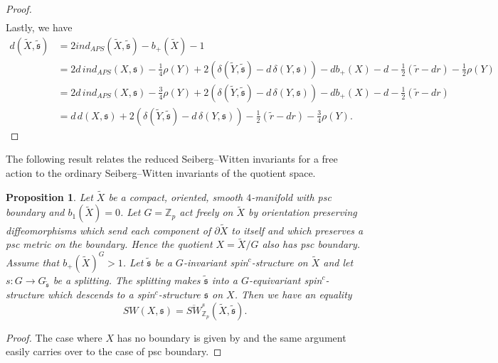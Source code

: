 \documentclass{amsart}
\newtheorem{proposition}[theorem]{Proposition}
\theoremstyle{definition}
\theoremstyle{remark}
\numberwithin{equation}{section}
\begin{document}
\begin{proof}
\begin{align*}
\end{align*}
Lastly, we have
\begin{align*}
d(\widetilde{X} , \widetilde{\mathfrak{s}}) &= 2 ind_{APS}(\widetilde{X} , \widetilde{\mathfrak{s}}) - b_+(\widetilde{X}) - 1 \\
&= 2d \, ind_{APS}(X , \mathfrak{s}) - \frac{1}{4}\rho(Y) + 2(\delta(\widetilde{Y} , \widetilde{\mathfrak{s}}) - d \, \delta(Y , \mathfrak{s})) - d b_+(X) - d -\frac{1}{2}( \widetilde{r} - dr) - \frac{1}{2}\rho(Y) \\
&= 2d \, ind_{APS}(X , \mathfrak{s}) - \frac{3}{4}\rho(Y) + 2(\delta(\widetilde{Y} , \widetilde{\mathfrak{s}}) - d \, \delta(Y , \mathfrak{s})) - d b_+(X) - d -\frac{1}{2}( \widetilde{r} - dr) \\
&= d \, d(X , \mathfrak{s}) + 2(\delta(\widetilde{Y} , \widetilde{\mathfrak{s}}) - d \, \delta(Y , \mathfrak{s})) -\frac{1}{2}( \widetilde{r} - dr) - \frac{3}{4}\rho(Y).
\end{align*}

\end{proof}


The following result relates the reduced Seiberg--Witten invariants for a free action to the ordinary Seiberg--Witten invariants of the quotient space.
\begin{proposition}\label{prop:free}
Let $\widetilde{X}$ be a compact, oriented, smooth $4$-manifold with psc boundary and $b_1(\widetilde{X}) = 0$. Let $G = \mathbb{Z}_p$ act freely on $\widetilde{X}$ by orientation preserving diffeomorphisms which send each component of $\partial \widetilde{X}$ to itself and which preserves a psc metric on the boundary. Hence the quotient $X = \widetilde{X}/G$ also has psc boundary. Assume that $b_+(\widetilde{X})^G > 1$. Let $\widetilde{\mathfrak{s}}$ be a $G$-invariant spin$^c$-structure on $\widetilde{X}$ and let $s : G \to G_{\widetilde{\mathfrak{s}}}$ be a splitting. The splitting makes $\widetilde{\mathfrak{s}}$ into a $G$-equivariant spin$^c$-structure which descends to a spin$^c$-structure $\mathfrak{s}$ on $X$. Then we have an equality
\[
SW(X , \mathfrak{s}) = \overline{SW}_{\mathbb{Z}_p}^s( \widetilde{X} , \widetilde{\mathfrak{s}}).
\]
\end{proposition}
\begin{proof}
The case where $X$ has no boundary is given by \cite[Proposition 6.1]{bar} and the same argument easily carries over to the case of psc boundary.
\end{proof}

\end{document}
